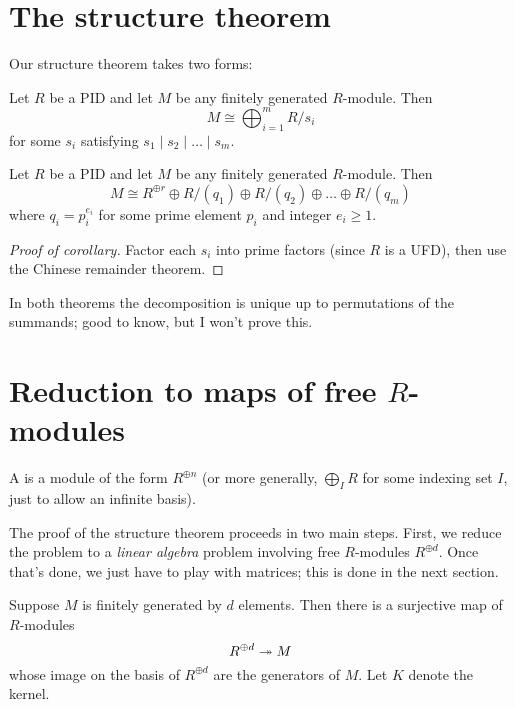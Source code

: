 \section{The structure theorem}
Our structure theorem takes two forms:
\begin{theorem}
	Let $R$ be a PID and let $M$ be any finitely generated $R$-module. Then
	\[ M \cong \bigoplus_{i=1}^m R/s_i \]
	for some $s_i$ satisfying $s_1 \mid s_2 \mid \dots \mid s_m$.
\end{theorem}
\begin{corollary}
	Let $R$ be a PID and let $M$ be any finitely generated $R$-module. Then
	\[ M \cong R^{\oplus r}
		\oplus R/(q_1) \oplus R/(q_2) \oplus \dots \oplus R/(q_m) \]
	where $q_i = p_i^{e_i}$ for some prime element $p_i$ and integer $e_i \ge 1$.
\end{corollary}
\begin{proof}
	[Proof of corollary]
	Factor each $s_i$ into prime factors (since $R$ is a UFD),
	then use the Chinese remainder theorem.
\end{proof}
\begin{remark}
	In both theorems the decomposition is unique up to
	permutations of the summands; good to know, but
	I won't prove this.
\end{remark}

\section{Reduction to maps of free $R$-modules}
\begin{definition}
	A  is a module of the form $R^{\oplus n}$
	(or more generally, $\bigoplus_I R$ for some indexing set $I$,
	just to allow an infinite basis).
\end{definition}
The proof of the structure theorem proceeds in two main steps.
First, we reduce the problem to a \emph{linear algebra} problem
involving free $R$-modules $R^{\oplus d}$.
Once that's done, we just have to play with matrices;
this is done in the next section.

Suppose $M$ is finitely generated by $d$ elements.
Then there is a surjective map of $R$-modules
\[ R^{\oplus d} \twoheadrightarrow M \]
whose image on the basis of $R^{\oplus d}$ are the generators of $M$.
Let $K$ denote the kernel.

